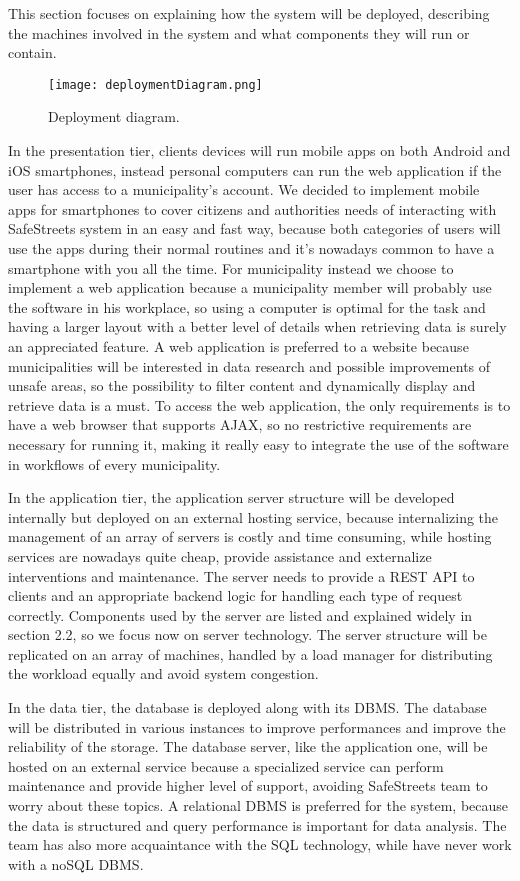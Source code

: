 This section focuses on explaining how the system will be deployed, describing the machines involved in the system and what components they will run or contain.

\begin{figure}[H]
	\centering
	\texttt{[image: deploymentDiagram.png]}
	\caption{Deployment diagram.}
\end{figure}

In the presentation tier, clients devices will run mobile apps on both Android and iOS smartphones, instead personal computers can run the web application if the user has access to a municipality's account. We decided to implement mobile apps for smartphones to cover citizens and authorities needs of interacting with SafeStreets system in an easy and fast way, because both categories of users will use the apps during their normal routines and it's nowadays common to have a smartphone with you all the time. For municipality instead we choose to implement a web application because a municipality member will probably use the software in his workplace, so using a computer is optimal for the task and having a larger layout with a better level of details when retrieving data is surely an appreciated feature. A web application is preferred to a website because municipalities will be interested in data research and possible improvements of unsafe areas, so the possibility to filter content and dynamically display and retrieve data is a must. To access the web application, the only requirements is to have a web browser that supports AJAX, so no restrictive requirements are necessary for running it, making it really easy to integrate the use of the software in workflows of every municipality.

In the application tier, the application server structure will be developed internally but deployed on an external hosting service, because internalizing the management of an array of servers is costly and time consuming, while hosting services are nowadays quite cheap, provide assistance and externalize interventions and maintenance. The server needs to provide a REST API to clients and an appropriate backend logic for handling each type of request correctly. Components used by the server are listed and explained widely in section 2.2, so we focus now on server technology. The server structure will be replicated on an array of machines, handled by a load manager for distributing the workload equally and avoid system congestion.

In the data tier, the database is deployed along with its DBMS. The database will be distributed in various instances to improve performances and improve the reliability of the storage. The database server, like the application one, will be hosted on an external service because a specialized service can perform maintenance and provide higher level of support, avoiding SafeStreets team to worry about these topics. A relational DBMS is preferred for the system, because the data is structured and query performance is important for data analysis. The team has also more acquaintance with the SQL technology, while have never work with a noSQL DBMS.
